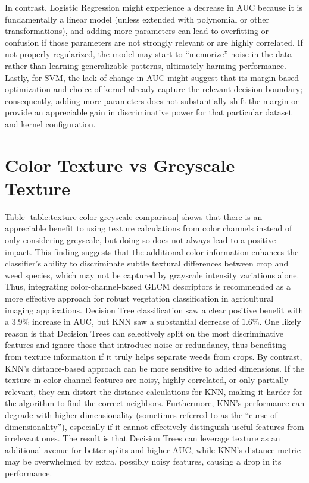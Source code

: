 \documentclass[letterpaper, notitlepage]{report}
\begin{document}
In contrast, Logistic Regression might experience a decrease in AUC because it is fundamentally a linear model (unless extended with polynomial or other transformations), and adding more parameters can lead to overfitting or confusion if those parameters are not strongly relevant or are highly correlated. If not properly regularized, the model may start to “memorize” noise in the data rather than learning generalizable patterns, ultimately harming performance. Lastly, for SVM, the lack of change in AUC might suggest that its margin-based optimization and choice of kernel already capture the relevant decision boundary; consequently, adding more parameters does not substantially shift the margin or provide an appreciable gain in discriminative power for that particular dataset and kernel configuration.


\section{Color Texture vs Greyscale Texture}
Table \ref{table:texture-color-greyscale-comparison} shows that there is an appreciable benefit to using texture calculations from color channels  instead of only considering greyscale, but doing so does not always lead to a positive impact. This finding suggests that the additional color information enhances the classifier’s ability to discriminate subtle textural differences between crop and weed species, which may not be captured by grayscale intensity variations alone. Thus, integrating color-channel-based GLCM descriptors is recommended as a more effective approach for robust vegetation classification in agricultural imaging applications. Decision Tree classification saw a clear positive benefit with a $3.9\%$ increase in AUC, but KNN saw a substantial decrease of $1.6\%$. One likely reason is that Decision Trees can selectively split on the most discriminative features and ignore those that introduce noise or redundancy, thus benefiting from texture information if it truly helps separate weeds from crops. By contrast, KNN’s distance-based approach can be more sensitive to added dimensions. If the texture-in-color-channel features are noisy, highly correlated, or only partially relevant, they can distort the distance calculations for KNN, making it harder for the algorithm to find the correct neighbors. Furthermore, KNN’s performance can degrade with higher dimensionality (sometimes referred to as the “curse of dimensionality”), especially if it cannot effectively distinguish useful features from irrelevant ones. The result is that Decision Trees can leverage texture as an additional avenue for better splits and higher AUC, while KNN’s distance metric may be overwhelmed by extra, possibly noisy features, causing a drop in its performance.
\end{document}
